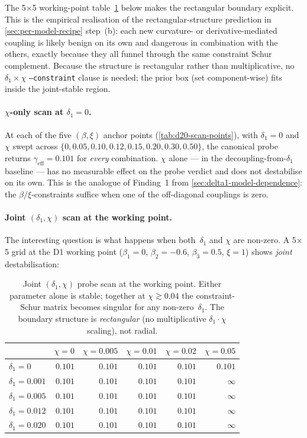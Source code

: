 The 5$\times$5 working-point table~\ref{tab:d21-joint-scan-working}
below makes the rectangular boundary explicit.  This is the
empirical realisation of the rectangular-structure prediction in
\cref{sec:per-model-recipe} step~(b): each new curvature- or
derivative-mediated coupling is likely benign on its own and
dangerous in combination with the others, exactly because they
all funnel through the same constraint Schur complement.  Because
the structure is rectangular rather than multiplicative, no
$\delta_1\!\times\!\chi$ \texttt{--constraint} clause is needed;
the prior box (set component-wise) fits inside the joint-stable
region.

\paragraph{$\chi$-only scan at $\delta_1=0$.}
At each of the five $(\beta,\xi)$ anchor points
(\cref{tab:d20-scan-points}), with $\delta_1=0$ and $\chi$ swept across
$\{0, 0.05, 0.10, 0.12, 0.15, 0.20, 0.30, 0.50\}$, the canonical probe
returns $\gamma_\mathrm{eff} = 0.101$ for \emph{every} combination.
$\chi$ alone --- in the decoupling-from-$\delta_1$ baseline --- has
no measurable effect on the probe verdict and does not destabilise on
its own.  This is the analogue of Finding~1 from
\cref{sec:delta1-model-dependence}: the $\beta/\xi$-constraints
suffice when one of the off-diagonal couplings is zero.

\paragraph{Joint $(\delta_1,\chi)$ scan at the working point.}
The interesting question is what happens when both~$\delta_1$ and
$\chi$ are non-zero.  A 5$\times$5 grid at the D1 working point
($\beta_1=0$, $\beta_2=-0.6$, $\beta_3=0.5$, $\xi=1$) shows
\emph{joint} destabilisation:

\begin{table}[h]
\centering
\begin{tabular}{lrrrrr}
\toprule
& $\chi=0$ & $\chi=0.005$ & $\chi=0.01$ & $\chi=0.02$ & $\chi=0.05$ \\
\midrule
$\delta_1=0$    & $0.101$ & $0.101$ & $0.101$ & $0.101$ & $0.101$ \\
$\delta_1=0.001$ & $0.101$ & $0.101$ & $0.101$ & $0.101$ & $\infty$ \\
$\delta_1=0.005$ & $0.101$ & $0.101$ & $0.101$ & $0.101$ & $\infty$ \\
$\delta_1=0.012$ & $0.101$ & $0.101$ & $0.101$ & $0.101$ & $\infty$ \\
$\delta_1=0.020$ & $0.101$ & $0.101$ & $0.101$ & $0.101$ & $\infty$ \\
\bottomrule
\end{tabular}
\caption{Joint $(\delta_1,\chi)$ probe scan at the working point.
Either parameter alone is stable; together at $\chi \gtrsim 0.04$ the
constraint-Schur matrix becomes singular for any non-zero~$\delta_1$.
The boundary structure is \emph{rectangular} (no multiplicative
$\delta_1\cdot\chi$ scaling), not radial.}
\label{tab:d21-joint-scan-working}
\end{table}

